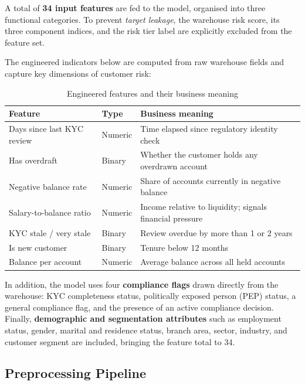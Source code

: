 A total of \textbf{34 input features} are fed to the model, organised into
three functional categories. To prevent \emph{target leakage}, the warehouse
risk score, its three component indices, and the risk tier label are
explicitly excluded from the feature set.

The engineered indicators below are computed from raw warehouse fields and
capture key dimensions of customer risk:

\begin{table}[H]
\centering
\caption{Engineered features and their business meaning}
\label{tab:engineered-features}
\begin{tabular}{|p{4.8cm}|l|p{5.5cm}|}
\hline
\textbf{Feature} & \textbf{Type} & \textbf{Business meaning} \\
\hline
Days since last KYC review & Numeric & Time elapsed since regulatory identity check \\
Has overdraft & Binary & Whether the customer holds any overdrawn account \\
Negative balance rate & Numeric & Share of accounts currently in negative balance \\
Salary-to-balance ratio & Numeric & Income relative to liquidity; signals financial pressure \\
KYC stale / very stale & Binary & Review overdue by more than 1 or 2 years \\
Is new customer & Binary & Tenure below 12 months \\
Balance per account & Numeric & Average balance across all held accounts \\
\hline
\end{tabular}
\end{table}

In addition, the model uses four \textbf{compliance flags} drawn directly
from the warehouse: KYC completeness status, politically exposed person (PEP)
status, a general compliance flag, and the presence of an active compliance
decision. Finally, \textbf{demographic and segmentation attributes} such as
employment status, gender, marital and residence status, branch area, sector,
industry, and customer segment are included, bringing the feature total to 34.

\subsection{Preprocessing Pipeline}


